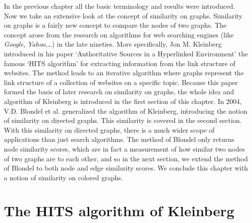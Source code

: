 \documentclass[a4paper,11pt]{report}
\begin{document}
In the previous chapter all the basic terminology and results were introduced.
Now we take an extensive look at the concept of similarity on graphs. Similarity on graphs is a fairly new
concept to compare the nodes of two graphs. The concept arose from the research on algorithms for web searching engines (like \emph{Google}, \emph{Yahoo},\ldots) in the late nineties. 
More specifically, Jon M. Kleinberg 
introduced in his paper `Authoritative Sources in a Hyperlinked Environment' 
\cite{kleinberg} the famous `HITS algorithm' for extracting information from the link structure of websites. The method leads to an iterative algorithm where 
graphs represent the link structure of a collection of websites on a specific topic. Because this paper formed the basis of later research on similarity on graphs, 
the
whole idea and algorithm of Kleinberg is introduced in the first section of this chapter. In 
2004, V.D. Blondel et al. \cite{blondel} generalized the algorithm of 
Kleinberg, introducing the notion of similarity on directed graphs. This similarity is covered in the second section. With this similarity on directed graphs, 
there is a much wider scope of applications than just search algorithms. The method
of Blondel only returns node similarity scores, which are in fact a 
measurement of how similar two nodes of two graphs are to each other, and so in 
the next section, we extend the method of Blondel to both node and edge 
similarity scores. We conclude this chapter with a notion of similarity on 
colored graphs. 

\section{The HITS algorithm of Kleinberg}
\end{document}
